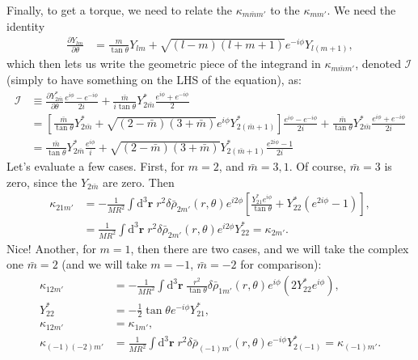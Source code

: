 \documentclass[12pt]{article}
\newcommand*{\pd}[2]{\frac{\partial#1}{\partial#2}}
\newcommand*{\bm}[1]{\boldsymbol{\mathbf{#1}}}
\newcommand*{\p}[1]{\left(#1\right)}
\newcommand*{\s}[1]{\left[#1\right]}
\begin{document}
Finally, to get a torque, we need to relate the $\kappa_{m\bar{m}m'}$ to the
$\kappa_{mm'}$. We need the identity
\begin{align}
    \pd{Y_{lm}}{\theta}
        &= \frac{m}{\tan\theta}Y_{lm} + \sqrt{(l - m)(l + m + 1)}
            e^{-i\phi}Y_{l(m+1)},
\end{align}
which then lets us write the geometric piece of the integrand in
$\kappa_{m\bar{m}m'}$, denoted $\mathcal{I}$ (simply to have something on the
LHS of the equation), as:
\begin{align}
    \mathcal{I}
        &\equiv
            \pd{Y_{2\bar{m}}^*}{\theta}
                    \frac{e^{i\phi} - e^{-i\phi}}{2i}
                + \frac{\bar{m}}{i\tan\theta}Y_{2\bar{m}}^*
                    \frac{e^{i\phi} + e^{-i\phi}}{2}\nonumber\\
        &=
            \s{\frac{\bar{m}}{\tan\theta} Y_{2\bar{m}}^*
                    + \sqrt{(2-\bar{m})(3+\bar{m})}e^{i\phi}Y_{2(\bar{m} + 1)}^*}
                \frac{e^{i\phi} - e^{-i\phi}}{2i}
            + \frac{\bar{m}}{\tan\theta}Y_{2\bar{m}}^*
                \frac{e^{i\phi} + e^{-i\phi}}{2i}\nonumber\\
        &=
            \frac{\bar{m}}{\tan\theta}Y_{2\bar{m}}^* \frac{e^{i\phi}}{i}
            + \sqrt{(2-\bar{m})(3+\bar{m})}Y_{2(\bar{m} + 1)}^*
                \frac{e^{2i\phi} - 1}{2i}
\end{align}
Let's evaluate a few cases. First, for $m=2$, and $\bar{m} = 3, 1$. Of course,
$\bar{m} = 3$ is zero, since the $Y_{2\bar{m}}$ are zero. Then
\begin{align}
    \kappa_{21m'}
        &=
            -\frac{1}{MR^2}
            \int\limits\mathrm{d}^3 \bm{r}\;
            r^2
            \delta \bar{\rho}_{2m'}(r, \theta)
            e^{i2\phi}
            \s{\frac{Y_{21}^* e^{i\phi}}{\tan\theta}
                + Y_{22}^* \p{e^{2i\phi} - 1}},\\
        &=
            \frac{1}{MR^2}
            \int\limits\mathrm{d}^3 \bm{r}\;
            r^2
            \delta \bar{\rho}_{2m'}(r, \theta)
            e^{i2\phi}
            Y_{22}^* = \kappa_{2m'}.
\end{align}
Nice! Another, for $m=1$, then there are two cases, and we will take the complex
one $\bar{m} = 2$ (and we will take $m=-1$, $\bar{m} = -2$ for comparison):
\begin{align}
    \kappa_{12m'}
        &=
            -\frac{1}{MR^2}
            \int\limits\mathrm{d}^3\bm{r}\;
                \frac{r^2}{\tan\theta}
                \delta\bar{\rho}_{1m'}(r, \theta)
                e^{i\phi}
                \p{
                    2Y_{22}^* e^{i\phi}
                },\\
    Y_{22}^*
        &= -\frac{1}{2}\tan\theta e^{-i\phi} Y_{21}^*,\\
    \kappa_{12m'} &= \kappa_{1m'},\\
    \kappa_{(-1)(-2)m'}
        &=
            \frac{1}{MR^2}
            \int\limits\mathrm{d}^3 \bm{r}\;
            r^2
            \delta \bar{\rho}_{(-1)m'}(r, \theta)
            e^{-i\phi}
            Y_{2(-1)}^* = \kappa_{(-1)m'}.
\end{align}
\end{document}
